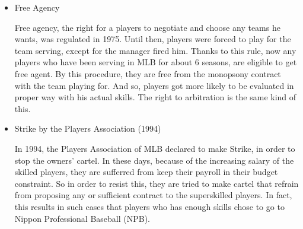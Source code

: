\documentclass[dvipdfmx, 12pt]{article}
\begin{document}
\begin{itemize}
  \item Free Agency

  Free agency, the right for a players to negotiate and choose any teams he wants, was regulated in 1975. Until then, players were forced to play for the team serving, except for the manager fired him.  Thanks to this rule, now any players who have been serving in MLB for about 6 seasons, are eligible to get free agent. By this procedure, they are free from the monopsony contract with the team playing for. And so, players got more likely to be evaluated in proper way with his actual skills. The right to arbitration is the same kind of this.

  \item Strike by the Players Association (1994)

  In 1994, the Players Association of MLB declared to make Strike, in order to stop the owners' cartel. In these days, because of the increasing salary of the skilled players, they are sufferred from keep their payroll in their budget constraint. So in order to resist this, they are tried to make cartel that refrain from proposing any or sufficient contract to the superskilled players. In fact, this results in such cases that players who has enough skills chose to go to Nippon Professional Baseball (NPB).

\end{itemize}
\end{document}

